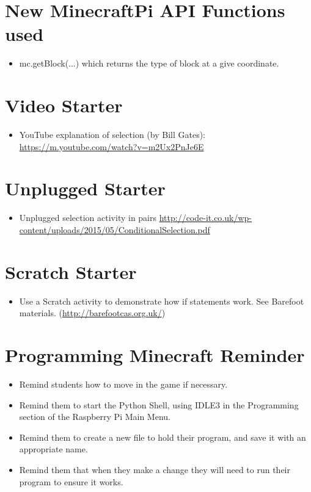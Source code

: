 \documentclass{geocraft-lesson-plan}
\begin{document}
\section*{New MinecraftPi API Functions used}
\begin{itemize}
\item mc.getBlock(...) which returns the type of block at a give coordinate.
\end{itemize}

\section*{Video Starter}
\begin{itemize}
\item YouTube explanation of selection (by Bill Gates): 
  {\textcolor{greenish}
    {\url{https://m.youtube.com/watch?v=m2Ux2PnJe6E}}}
\end{itemize}

\section*{Unplugged Starter}
\begin{itemize}
\item Unplugged selection activity in pairs
  {\textcolor{greenish}
    {\url{http://code-it.co.uk/wp-content/uploads/2015/05/ConditionalSelection.pdf}}}
\end{itemize}

\section*{Scratch Starter}
\begin{itemize}
\item Use a Scratch activity to demonstrate how if statements
  work. See Barefoot materials. ({\textcolor{greenish}
    {\url{http://barefootcas.org.uk/}}})  
\end{itemize}

\section*{Programming Minecraft Reminder}
\begin{itemize}
\item Remind students how to move in the game if necessary.
\item Remind them to start the Python Shell, using IDLE3 in the Programming section of the Raspberry Pi Main Menu.
\item Remind them to create a new file to hold their program, and save it with an appropriate name.  
\item Remind them that when they make a change they will need to run their program to ensure it works.
\end{itemize}
\end{document}
